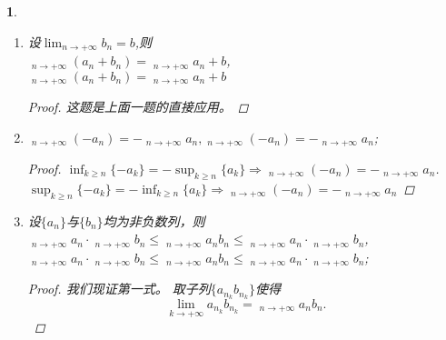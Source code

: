 \documentclass[utf8]{book}
\newtheorem{example}{}[section]             %
\DeclareMathOperator*\lowlim{\underline{lim}}
\DeclareMathOperator*\uplim{\overline{lim}}
\begin{document}
\begin{example}
\begin{enumerate}
\begin{proof}
取子列$\{a_{n_k} + b_{n_k}\}$,使得
$$\displaystyle\lim_{k\to +\infty}(a_{n_k} + b_{n_k}) =  \displaystyle\uplim_{n\to +\infty}(a_n + b_n).$$
取子列$\{b_{n_{k_l}}\}$使得
$$\displaystyle\lim_{l\to +\infty}b_{n_{k_l}} = \displaystyle\uplim_{k\to +\infty}b_{n_k} \leq \displaystyle\uplim_{n\to +\infty}b_n.$$
另一方面
$$\displaystyle\lim_{l\to +\infty}a_{n_{k_l}}\leq \displaystyle\uplim_{k\to +\infty}a_{n_k} \leq \displaystyle\uplim_{n\to +\infty}a_n.$$
所以
$\displaystyle\uplim_{n\to +\infty}(a_n + b_n) \leq \displaystyle\uplim_{n\to +\infty}a_n + \displaystyle\uplim_{n\to +\infty}b_n.$
\end{proof}
\item 设$\displaystyle\lim_{n\to +\infty}b_n = b$,则\\
$\displaystyle\lowlim_{n\to +\infty}(a_n + b_n) = \displaystyle\lowlim_{n\to +\infty}a_n + b$,\\
$\displaystyle\uplim_{n\to +\infty}(a_n + b_n) = \displaystyle\uplim_{n\to +\infty}a_n + b$
\begin{proof}
这题是上面一题的直接应用。
\end{proof}
\item $\displaystyle\lowlim_{n\to +\infty}(-a_n)=-\displaystyle\uplim_{n\to +\infty}a_n, \displaystyle\uplim_{n\to +\infty}(-a_n)=-\displaystyle\lowlim_{n\to +\infty}a_n$;
\begin{proof}$\displaystyle\inf_{k\geq n}\{-a_k\} = -\displaystyle \sup_{k \geq n}\{a_k\} \Rightarrow \displaystyle\lowlim_{n\to +\infty}(-a_n)=-\displaystyle\uplim_{n\to +\infty}a_n$.\\
$\displaystyle\sup_{k\geq n}\{-a_k\} = -\displaystyle \inf_{k \geq n}\{a_k\} \Rightarrow \displaystyle\uplim_{n\to +\infty}(-a_n)=-\displaystyle\lowlim_{n\to +\infty}a_n$
\end{proof}
\item 设$\{a_n\}$与$\{b_n\}$均为非负数列，则\\
$\displaystyle\lowlim_{n\to +\infty}a_n\cdot \displaystyle\lowlim_{n\to +\infty}b_n \leq \displaystyle\lowlim_{n\to +\infty}a_nb_n\leq \displaystyle\lowlim_{n\to +\infty}a_n\cdot\displaystyle\uplim_{n\to +\infty}b_n$,\\
$\displaystyle\lowlim_{n\to +\infty}a_n\cdot \displaystyle\uplim_{n\to +\infty}b_n \leq \displaystyle\uplim_{n\to +\infty}a_nb_n\leq \displaystyle\uplim_{n\to +\infty}a_n\cdot\displaystyle\uplim_{n\to +\infty}b_n$;
\begin{proof}
我们现证第一式。
取子列$\{a_{n_k}b_{n_k}\}$使得
$$\displaystyle\lim_{k\to +\infty}a_{n_k}b_{n_k}=\displaystyle\lowlim_{n\to +\infty}a_nb_n.$$

\end{proof}
\end{enumerate}
\end{example}
\end{document}
